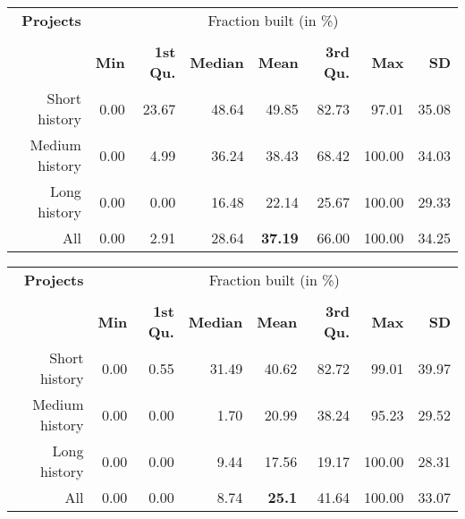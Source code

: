 \begin{table*}[h]
\caption{Compilable snapshots - Distribution (top: Reduced Original Study, bottom: Replication Study).}
\label{table:replication-compilability}
\begin{center}

\begin{tabular}{r|rrrrrrr}
\toprule
  \bf{Projects} & \multicolumn{7}{c}{Fraction built (in \%)} \\
                & \multicolumn{7}{c}{} \\
                & \bf{Min} & \bf{1st Qu.} & \bf{Median} & \bf{Mean} & \bf{3rd Qu.} & \bf{Max} & \bf{SD} \\  
\midrule
Short history  & 0.00     & 23.67        & 48.64       & 49.85      & 82.73       &  97.01   & 35.08 \\ 
Medium history & 0.00     &  4.99        & 36.24       & 38.43      & 68.42       & 100.00   & 34.03 \\
Long history   & 0.00     &  0.00        & 16.48       & 22.14      & 25.67       & 100.00   & 29.33 \\
\midrule
All            & 0.00     & 2.91         & 28.64       & \bf{37.19} & 66.00       & 100.00   & 34.25 \\ 
\bottomrule
\end{tabular}
\end{center}

\begin{center}
\begin{tabular}{r|rrrrrrr}
  \toprule
  \bf{Projects} & \multicolumn{7}{c}{Fraction built (in \%)} \\
                & \multicolumn{7}{c}{} \\
                & \bf{Min} & \bf{1st Qu.} & \bf{Median} & \bf{Mean} & \bf{3rd Qu.} & \bf{Max} & \bf{SD} \\  
\midrule
Short history  & 0.00     & 0.55         & 31.49       & 40.62      & 82.72        & 99.01     & 39.97 \\ 
Medium history & 0.00     & 0.00         & 1.70        & 20.99      & 38.24        & 95.23     & 29.52 \\ 
Long history   & 0.00     & 0.00         & 9.44        & 17.56      & 19.17        & 100.00    & 28.31 \\ 
\midrule
All            & 0.00     & 0.00         & 8.74        & \bf{25.1}  & 41.64        & 100.00    & 33.07 \\ 
\bottomrule
\end{tabular}
\end{center}
\end{table*}


